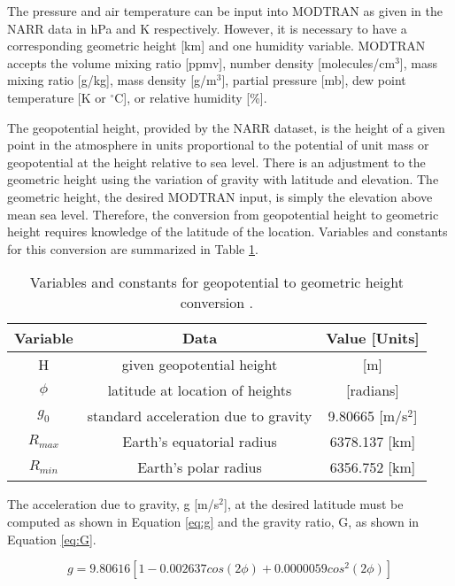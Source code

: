 \documentclass{book}
\begin{document}
The pressure and air temperature can be input into MODTRAN as given in the NARR data in hPa and K respectively.  However, it is necessary to have a corresponding geometric height [km] and one humidity variable.  MODTRAN accepts the volume mixing ratio [ppmv], number density [molecules/cm$^3$], mass mixing ratio [g/kg], mass density [g/m$^3$], partial pressure [mb], dew point temperature [K or $^\circ$C], or relative humidity [\%].

The geopotential height, provided by the NARR dataset, is the height of a given point in the atmosphere in units proportional to the potential of unit mass or geopotential at the height relative to sea level.  There is an adjustment to the geometric height using the variation of gravity with latitude and elevation.  The geometric height, the desired MODTRAN input, is simply the elevation above mean sea level.  Therefore, the conversion from geopotential height to geometric height requires knowledge of the latitude of the location.  Variables and constants for this conversion are summarized in Table \ref{tab:heightConversion}.

\begin{table}[H]
\begin{center}
\begin{tabular}{|c | c | c |}
\hline
Variable & Data & Value [Units] \\ \hline
H & given geopotential height & [m] \\ \hline
$\phi$ & latitude at location of heights & [radians] \\ \hline
$g_0$ & standard acceleration due to gravity & 9.80665 [m/s$^2$] \\ \hline
$R_{max}$ & Earth's equatorial radius & 6378.137 [km] \\ \hline
$R_{min}$ & Earth's polar radius & 6356.752 [km] \\ \hline
\end{tabular}
\caption{Variables and constants for geopotential to geometric height conversion \cite{wright_1997}.}
\label{tab:heightConversion}
\end{center}
\end{table}

The acceleration due to gravity, g [m/s$^2$], at the desired latitude must be computed as shown in Equation \ref{eq:g} and the gravity ratio, G, as shown in Equation \ref{eq:G}. 

\begin{equation}
g = 9.80616[1-0.002637cos(2\phi)+0.0000059cos^2(2\phi)]
\label{eq:g}
\end{equation}
\end{document}
